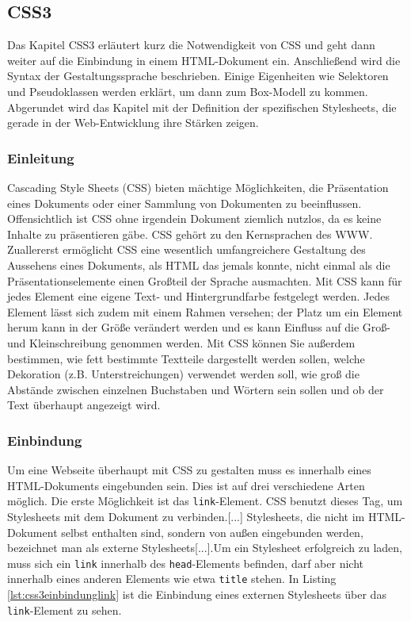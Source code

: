 \subsection{CSS3}
Das Kapitel CSS3 erläutert kurz die Notwendigkeit von CSS und geht dann weiter auf die Einbindung in einem HTML-Dokument ein. Anschließend wird die Syntax der Gestaltungssprache beschrieben. Einige Eigenheiten wie Selektoren und Pseudoklassen werden erklärt, um dann zum Box-Modell zu kommen. Abgerundet wird das Kapitel mit der Definition der spezifischen Stylesheets, die gerade in der Web-Entwicklung ihre Stärken zeigen.

\subsubsection{Einleitung}
\glqq Cascading Style Sheets (CSS) bieten mächtige Möglichkeiten, die Präsentation eines Dokuments oder einer Sammlung von Dokumenten zu beeinflussen. Offensichtlich ist CSS ohne irgendein Dokument ziemlich nutzlos, da es keine Inhalte zu präsentieren gäbe.\grqq{}\cite[S.1]{MeyeCasc2005} CSS gehört zu den Kernsprachen des WWW. \glqq Zuallererst ermöglicht CSS eine wesentlich umfangreichere Gestaltung des Aussehens eines Dokuments, als HTML das jemals konnte, nicht einmal als die Präsentationselemente einen Großteil der Sprache ausmachten. Mit CSS kann für jedes Element eine eigene Text- und Hintergrundfarbe festgelegt werden. Jedes Element lässt sich zudem mit einem Rahmen versehen; der Platz um ein Element herum kann in der Größe verändert werden und es kann Einfluss auf die Groß- und Kleinschreibung genommen werden. Mit CSS können Sie außerdem  bestimmen, wie fett bestimmte Textteile dargestellt werden sollen, welche Dekoration (z.B. Unterstreichungen) verwendet werden soll, wie groß die Abstände zwischen einzelnen Buchstaben und Wörtern sein sollen und ob der Text überhaupt angezeigt wird.\grqq{}\cite[S.4]{MeyeCasc2005}

\subsubsection{Einbindung} Um eine Webseite überhaupt mit CSS zu gestalten muss es innerhalb eines HTML-Dokuments eingebunden sein. Dies ist auf drei verschiedene Arten möglich. Die erste Möglichkeit ist das \texttt{link}-Element. \glqq CSS benutzt dieses Tag, um Stylesheets mit dem Dokument zu verbinden.[...] Stylesheets, die nicht im HTML-Dokument selbst enthalten sind, sondern von außen eingebunden werden, bezeichnet man als externe Stylesheets[...].Um ein Stylesheet erfolgreich zu laden, muss sich ein \texttt{link} innerhalb des \texttt{head}-Elements befinden, darf aber nicht innerhalb eines anderen Elements wie etwa \texttt{title} stehen.\grqq{}\cite[S.14]{MeyeCasc2005} In Listing \ref{lst:css3einbindunglink} ist die Einbindung eines externen Stylesheets über das \texttt{link}-Element zu sehen.
	

